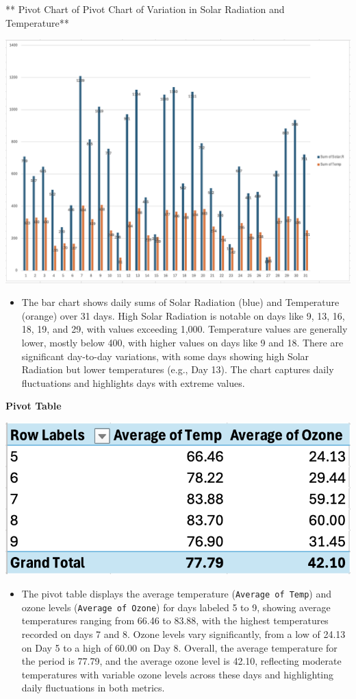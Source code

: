 \documentclass[
  letterpaper,
  DIV=11,
  numbers=noendperiod]{scrreprt}
\providecommand{\tightlist}{%
  \setlength{\itemsep}{0pt}\setlength{\parskip}{0pt}}\usepackage{longtable,booktabs,array}
\begin{document}
** Pivot Chart of Pivot Chart of Variation in Solar Radiation and
Temperature**

\includegraphics{pivot1_chart_baruga.png}

\begin{itemize}
\tightlist
\item
  The bar chart shows daily sums of Solar Radiation (blue) and
  Temperature (orange) over 31 days. High Solar Radiation is notable on
  days like 9, 13, 16, 18, 19, and 29, with values exceeding 1,000.
  Temperature values are generally lower, mostly below 400, with higher
  values on days like 9 and 18. There are significant day-to-day
  variations, with some days showing high Solar Radiation but lower
  temperatures (e.g., Day 13). The chart captures daily fluctuations and
  highlights days with extreme values.
\end{itemize}

\textbf{Pivot Table}

\includegraphics{pivot2_table_baruga.png}

\begin{itemize}
\tightlist
\item
  The pivot table displays the average temperature
  (\texttt{Average\ of\ Temp}) and ozone levels
  (\texttt{Average\ of\ Ozone}) for days labeled 5 to 9, showing average
  temperatures ranging from 66.46 to 83.88, with the highest
  temperatures recorded on days 7 and 8. Ozone levels vary
  significantly, from a low of 24.13 on Day 5 to a high of 60.00 on Day
  8. Overall, the average temperature for the period is 77.79, and the
  average ozone level is 42.10, reflecting moderate temperatures with
  variable ozone levels across these days and highlighting daily
  fluctuations in both metrics.
\end{itemize}
\end{document}
